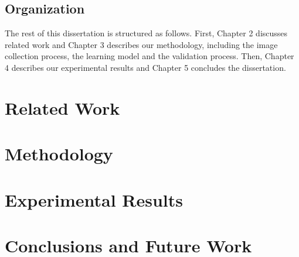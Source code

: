 \documentclass[msc]{ppgccufmg}
\begin{document}
\section{Organization}

The rest of this dissertation is structured as follows. First, Chapter 2 discusses related work and Chapter 3 describes our methodology, including the image collection process, the learning model and the validation process. Then, Chapter 4 describes our experimental results and Chapter 5 concludes the dissertation.

\chapter{Related Work}

\chapter{Methodology}

\chapter{Experimental Results}

\chapter{Conclusions and Future Work}

\end{document}
